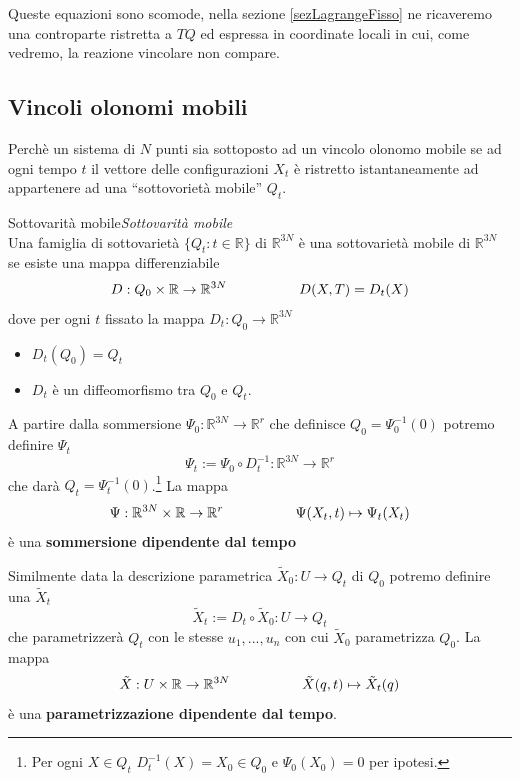 \documentclass[11pt,a4paper,twoside]{book}
\newenvironment{definizione}[1][\empty]{\begin{Definizione}{
\ifx\empty#1\relax\else\mdseries\itshape#1\\\fi
}{}}{\end{Definizione}}
\theoremstyle{esss}
\theoremstyle{dotless}
\numberwithin{equation}{section} %
\begin{document}
Queste equazioni sono scomode, nella sezione \ref{sezLagrangeFisso} ne ricaveremo una controparte ristretta a $TQ$ ed espressa in coordinate locali in cui, come vedremo, la reazione vincolare non compare.

\subsection{Vincoli olonomi mobili}

Perchè un sistema di $N$ punti sia sottoposto ad un vincolo olonomo mobile se ad ogni tempo $t$ il vettore delle configurazioni $X_t$ è ristretto istantaneamente ad appartenere ad una ``sottovorietà mobile'' $Q_t$.

\begin{definizione}[Sottovarità mobile]
Una famiglia di sottovarietà $\{Q_t : t\in\mathbb{R}\}$ di $\mathbb{R}^{3N}$ è una sottovarietà mobile di $\mathbb{R}^{3N}$ se esiste una mappa differenziabile
\[
D:Q_0\times\mathbb{R}\rightarrow\mathbb{R}^{3N} \hspace{0.15\linewidth} D(X,T)=D_t(X)
\]
dove per ogni $t$ fissato la mappa $D_t:Q_0\rightarrow\mathbb{R}^{3N}$ \begin{itemize}
\item $D_t(Q_0)=Q_t$
\item $D_t$ è un diffeomorfismo tra $Q_0$ e $Q_t$.
\end{itemize}
\end{definizione}

A partire dalla sommersione $\Psi_0:\mathbb{R}^{3N}\rightarrow\mathbb{R}^r$ che definisce $Q_0=\Psi_0^{-1}(0)$ potremo definire  $\Psi_t$
\[
\Psi_t:=\Psi_0\circ D_t^{-1} :\mathbb{R}^{3N}\rightarrow\mathbb{R}^r
\]
che darà $Q_t=\Psi_t^{-1}(0)$.\footnote{Per ogni $X\in Q_t$ $D_t^{-1}(X)=X_0\in Q_0$ e $\Psi_0(X_0)=0$ per ipotesi.}
La mappa 
\[
\Psi:\mathbb{R}^{3N}\times\mathbb{R}\rightarrow\mathbb{R}^r \hspace{0.15\linewidth} \Psi(X_t,t)\mapsto\Psi_t(X_t)
\]
è una \textbf{sommersione dipendente dal tempo}

Similmente data la descrizione parametrica $\tilde{X}_0:U\rightarrow Q_t$ di $Q_0$ potremo definire una $\tilde{X}_t$
\[
\tilde{X}_t:=D_t\circ\tilde{X}_0 :U\rightarrow Q_t
\]
che parametrizzerà $Q_t$ con le stesse $u_1,...,u_n$ con cui $\tilde{X}_0$ parametrizza $Q_0$. La mappa
\[
\tilde{X}:U\times\mathbb{R}\rightarrow\mathbb{R}^{3N} \hspace{0.15\linewidth} \tilde{X}(q,t)\mapsto\tilde{X}_t(q)
\]
è una \textbf{parametrizzazione dipendente dal tempo}.
\end{document}
